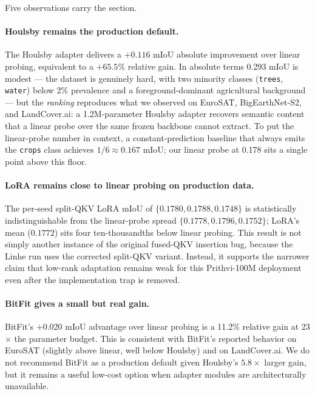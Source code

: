 Five observations carry the section.

\paragraph{Houlsby remains the production default.} The Houlsby adapter delivers a $+0.116$ mIoU absolute improvement over linear probing, equivalent to a $+65.5\%$ relative gain. In absolute terms 0.293 mIoU is modest --- the dataset is genuinely hard, with two minority classes (\texttt{trees}, \texttt{water}) below 2\% prevalence and a foreground-dominant agricultural background --- but the \emph{ranking} reproduces what we observed on EuroSAT, BigEarthNet-S2, and LandCover.ai: a 1.2M-parameter Houlsby adapter recovers semantic content that a linear probe over the same frozen backbone cannot extract. To put the linear-probe number in context, a constant-prediction baseline that always emits the \texttt{crops} class achieves $1/6 \approx 0.167$ mIoU; our linear probe at 0.178 sits a single point above this floor.

\paragraph{LoRA remains close to linear probing on production data.} The per-seed split-QKV LoRA mIoU of $\{0.1780, 0.1788, 0.1748\}$ is statistically indistinguishable from the linear-probe spread $\{0.1778, 0.1796, 0.1752\}$; LoRA's mean ($0.1772$) sits four ten-thousandths below linear probing. This result is not simply another instance of the original fused-QKV insertion bug, because the Linhe run uses the corrected split-QKV variant. Instead, it supports the narrower claim that low-rank adaptation remains weak for this Prithvi-100M deployment even after the implementation trap is removed.

\paragraph{BitFit gives a small but real gain.} BitFit's $+0.020$ mIoU advantage over linear probing is a 11.2\% relative gain at 23$\times$ the parameter budget. This is consistent with BitFit's reported behavior on EuroSAT (slightly above linear, well below Houlsby) and on LandCover.ai. We do not recommend BitFit as a production default given Houlsby's $5.8\times$ larger gain, but it remains a useful low-cost option when adapter modules are architecturally unavailable.

